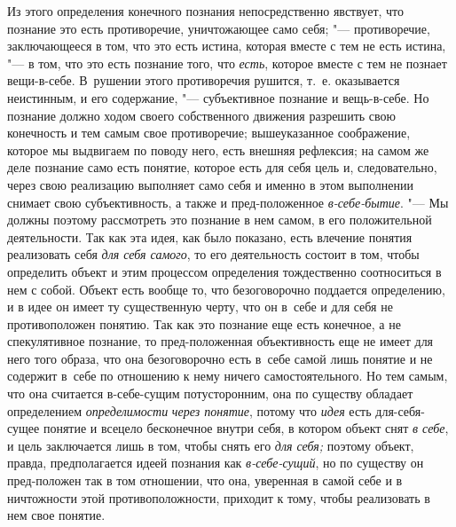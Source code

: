 Из этого определения конечного познания непосредственно
явствует, что познание это есть противоречие, уничтожающее само себя;
"--- противоречие, заключающееся в том, что это есть истина,
которая вместе с тем не есть истина, "--- в том, что это есть
познание того, что {\em есть},
которое вместе с тем не познает вещи-в-себе. В~рушении этого
противоречия рушится, т.~е. оказывается неистинным, и его содержание, "---
субъективное познание и вещь-в-себе. Но познание должно ходом
своего собственного движения разрешить свою конечность и тем самым свое
противоречие; вышеуказанное соображение, которое мы выдвигаем по поводу
него, есть внешняя рефлексия; на самом же деле познание само есть понятие,
которое есть для себя цель и, следовательно, через свою реализацию
выполняет само себя и именно в этом выполнении снимает свою субъективность,
а также и пред-положенное
{\em в-себе-бытие}.
"--- Мы должны поэтому рассмотреть это познание в нем самом, в
его положительной деятельности. Так как эта идея, как было показано, есть
влечение понятия реализовать себя
{\em для себя самого}, то
его деятельность состоит в том, чтобы определить объект и этим процессом
определения тождественно соотноситься в нем с собой. Объект есть вообще то,
что безоговорочно поддается определению, и в идее он имеет ту существенную
черту, что он в~себе и для себя не противоположен понятию. Так как это
познание еще есть конечное, а не спекулятивное познание, то пред-положенная
объективность еще не имеет для него того образа, что она безоговорочно есть
в~себе самой лишь понятие и не содержит в~себе по отношению к нему ничего
самостоятельного. Но тем самым, что она считается в-себе-сущим
потусторонним, она по существу обладает определением
{\em определимости}
{\em через понятие},
потому что {\em идея}
есть для-себя-сущее понятие и всецело бесконечное внутри
себя, в котором объект снят {\em в
себе}, и цель заключается лишь в том, чтобы снять его
{\em для себя;} поэтому
объект, правда, предполагается идеей познания как
{\em в-себе-сущий}, но по
существу он пред-положен так в том отношении, что она,
уверенная в самой себе и в ничтожности этой
противоположности, приходит к тому, чтобы реализовать в нем свое понятие.

